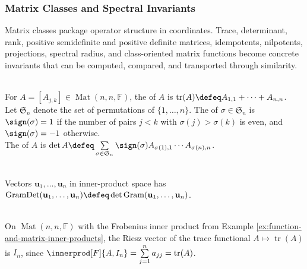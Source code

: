 \subsubsection{Matrix Classes and Spectral Invariants}

Matrix classes package operator structure in coordinates. Trace, determinant, rank, positive semidefinite and positive definite matrices, idempotents, nilpotents, projections, spectral radius, and class-oriented matrix functions become concrete invariants that can be computed, compared, and transported through similarity.

\begin{definition} \label{def:matrix-trace-and-determinant} \\
For $A=[A_{j,k}]\in\operatorname{Mat}(n,n,\mathbb{F})$, the  of $A$ is $\operatorname{tr}(A)\defeq A_{1,1}+\cdots+A_{n,n}$.\\
Let $\mathfrak{S}_n$ denote the set of permutations of $\{1,\ldots,n\}$. The  of $\sigma\in\mathfrak{S}_n$ is $\sign(\sigma)=1$ if the number of pairs $j<k$ with $\sigma(j)>\sigma(k)$ is even, and $\sign(\sigma)=-1$ otherwise.\\
The  of $A$ is $\det A \defeq \sum\limits_{\sigma\in\mathfrak{S}_n} \sign(\sigma)A_{\sigma(1),1}\cdots A_{\sigma(n),n}$.
\end{definition}

\begin{definition} \label{def:gram-determinant} \\
Vectors $\mathbf{u}_1,\ldots,\mathbf{u}_n$ in inner-product space has  $\operatorname{GramDet}(\mathbf{u}_1,\ldots,\mathbf{u}_n) \defeq \det \operatorname{Gram}(\mathbf{u}_1,\ldots,\mathbf{u}_n)$.
\end{definition}

\begin{example} \label{ex:frobenius-trace-riesz-vector} \\
On $\operatorname{Mat}(n,n,\mathbb{F})$ with the Frobenius inner product from Example \ref{ex:function-and-matrix-inner-products}, the Riesz vector of the trace functional $A\mapsto\operatorname{tr}(A)$ is $I_n$, since $\innerprod[F]{A,I_n}=\sum\limits_{j=1}^{n}a_{jj}=\operatorname{tr}(A)$.
\end{example}

